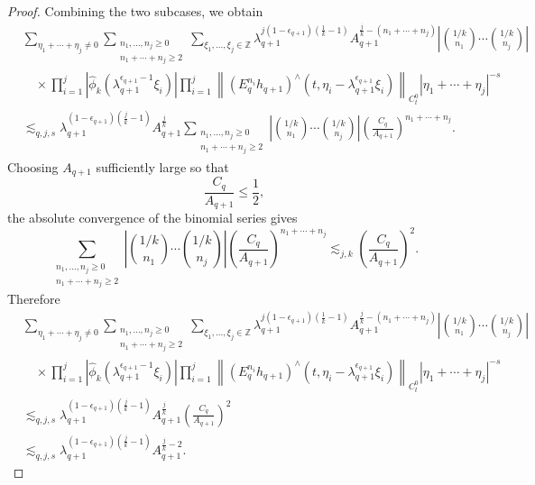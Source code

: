 \documentclass[10pt,a4paper]{amsart}
\begin{document}
\begin{proof}
Combining the two subcases, we obtain
\[
\begin{aligned}
&\sum_{\eta_1+\cdots+\eta_j\neq0}
\sum_{\substack{n_1,\ldots,n_j\geq0\\ n_1+\cdots+n_j\geq2}}
\sum_{\xi_1,\ldots,\xi_j\in\mathbb Z}
\lambda_{q+1}^{j(1-\epsilon_{q+1})(\frac1k-1)}
A_{q+1}^{\frac jk-(n_1+\cdots+n_j)}
\left|\binom{1/k}{n_1}\cdots\binom{1/k}{n_j}\right|
\\
&\quad\times
\prod_{i=1}^j
\left|
\hat{\phi}_k
\left(\lambda_{q+1}^{\epsilon_{q+1}-1}\xi_i\right)
\right|
\prod_{i=1}^j
\left\|
\left(E_q^{n_i}h_{q+1}\right)^\wedge
\left(t,\eta_i-\lambda_{q+1}^{\epsilon_{q+1}}\xi_i\right)
\right\|_{C_t^0}
|\eta_1+\cdots+\eta_j|^{-s}
\\
&\lesssim_{q,j,s}
\lambda_{q+1}^{(1-\epsilon_{q+1})(\frac jk-1)}
A_{q+1}^{\frac jk}
\sum_{\substack{n_1,\ldots,n_j\geq0\\ n_1+\cdots+n_j\geq2}}
\left|\binom{1/k}{n_1}\cdots\binom{1/k}{n_j}\right|
\left(\frac{C_q}{A_{q+1}}\right)^{n_1+\cdots+n_j}.
\end{aligned}
\]
Choosing $A_{q+1}$ sufficiently large so that
\begin{equation}\label{eq:A_q+1_cond}
    \frac{C_q}{A_{q+1}}\leq \frac{1}{2},
\end{equation}
the absolute convergence of the binomial series gives
\[
\sum_{\substack{n_1,\ldots,n_j\geq0\\ n_1+\cdots+n_j\geq2}}
\left|\binom{1/k}{n_1}\cdots\binom{1/k}{n_j}\right|
\left(\frac{C_q}{A_{q+1}}\right)^{n_1+\cdots+n_j}
\lesssim_{j,k}
\left(\frac{C_q}{A_{q+1}}\right)^2.
\]
Therefore
\[
\begin{aligned}
&\sum_{\eta_1+\cdots+\eta_j\neq0}
\sum_{\substack{n_1,\ldots,n_j\geq0\\ n_1+\cdots+n_j\geq2}}
\sum_{\xi_1,\ldots,\xi_j\in\mathbb Z}
\lambda_{q+1}^{j(1-\epsilon_{q+1})(\frac1k-1)}
A_{q+1}^{\frac jk-(n_1+\cdots+n_j)}
\left|\binom{1/k}{n_1}\cdots\binom{1/k}{n_j}\right|
\\
&\quad\times
\prod_{i=1}^j
\left|
\hat{\phi}_k
\left(\lambda_{q+1}^{\epsilon_{q+1}-1}\xi_i\right)
\right|
\prod_{i=1}^j
\left\|
\left(E_q^{n_i}h_{q+1}\right)^\wedge
\left(t,\eta_i-\lambda_{q+1}^{\epsilon_{q+1}}\xi_i\right)
\right\|_{C_t^0}
|\eta_1+\cdots+\eta_j|^{-s}
\\
&\lesssim_{q,j,s}
\lambda_{q+1}^{(1-\epsilon_{q+1})(\frac jk-1)}
A_{q+1}^{\frac jk}
\left(\frac{C_q}{A_{q+1}}\right)^2
\\
&\lesssim_{q,j,s}
\lambda_{q+1}^{(1-\epsilon_{q+1})(\frac jk-1)}
A_{q+1}^{\frac jk-2}.

\end{aligned}\]
\end{proof}
\end{document}
